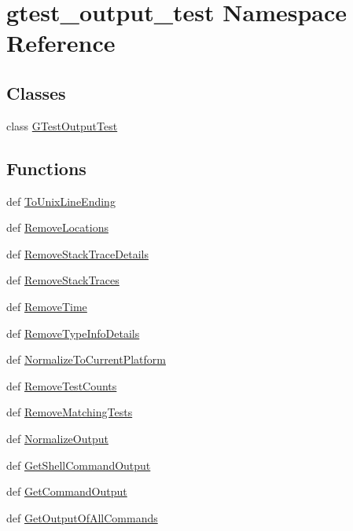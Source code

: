 \hypertarget{namespacegtest__output__test}{\section{gtest\-\_\-output\-\_\-test Namespace Reference}
\label{namespacegtest__output__test}
}
\subsection*{Classes}
\begin{DoxyCompactItemize}
\item 
class \hyperlink{classgtest__output__test_1_1_g_test_output_test}{G\-Test\-Output\-Test}
\end{DoxyCompactItemize}
\subsection*{Functions}
\begin{DoxyCompactItemize}
\item 
def \hyperlink{namespacegtest__output__test_a3454cfbe1dc13123ffc8d35189acfc22}{To\-Unix\-Line\-Ending}
\item 
def \hyperlink{namespacegtest__output__test_a121831a3be4499f43226a849460076eb}{Remove\-Locations}
\item 
def \hyperlink{namespacegtest__output__test_a06f3f2b9517a19912a1b45c6af00a6fd}{Remove\-Stack\-Trace\-Details}
\item 
def \hyperlink{namespacegtest__output__test_a78564bc7c92e26e73b93acdc8af703e5}{Remove\-Stack\-Traces}
\item 
def \hyperlink{namespacegtest__output__test_a98f04785c16d829447ccffc63f3b35f1}{Remove\-Time}
\item 
def \hyperlink{namespacegtest__output__test_a0c15aa843eff7b1df244c46cca13ea57}{Remove\-Type\-Info\-Details}
\item 
def \hyperlink{namespacegtest__output__test_a20cf98e6d794a2c732acc6a8b13f3c4c}{Normalize\-To\-Current\-Platform}
\item 
def \hyperlink{namespacegtest__output__test_adee32bbc6a50383452627c3c4888231a}{Remove\-Test\-Counts}
\item 
def \hyperlink{namespacegtest__output__test_a49e9b498f20bb00261d74e752c1e231d}{Remove\-Matching\-Tests}
\item 
def \hyperlink{namespacegtest__output__test_ab48290651c02da54b54a0e1a52afde80}{Normalize\-Output}
\item 
def \hyperlink{namespacegtest__output__test_a52d428b680879fbe96182f7db8ae738e}{Get\-Shell\-Command\-Output}
\item 
def \hyperlink{namespacegtest__output__test_a538ef64ef4ec54fa01ac5b790dce1094}{Get\-Command\-Output}
\item 
def \hyperlink{namespacegtest__output__test_a9d3e73851ab6b1d226fc584036025839}{Get\-Output\-Of\-All\-Commands}
\end{DoxyCompactItemize}
